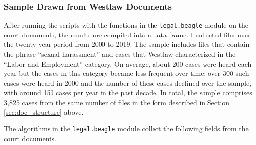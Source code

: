 \documentclass[11pt]{paper}
\begin{document}
\subsubsection{Sample Drawn from Westlaw Documents} \label{WestLaw_sample}

After running the scripts with the functions in the \texttt{legal.beagle} module 
on the court documents, the results are compiled into a data frame. 
I collected files over the twenty-year period from 2000 to 2019. 
The sample includes files that contain the phrase ``sexual harassment'' 
and cases that Westlaw characterized in the ``Labor and Employment'' category. 
On average,  about 200 cases were heard each year
but the cases in this category became less frequent over time:
over 300 such cases were heard in 2000 
and the number of these cases declined over the sample, with around 150 cases 
per year in the past decade. 
In total, the sample comprises 3,825 cases
from the same number of files in the form 
described in Section \ref{sec:doc_structure} above.

The algorithms in the \texttt{legal.beagle} module
collect the following fields from the court documents. 
\end{document}
